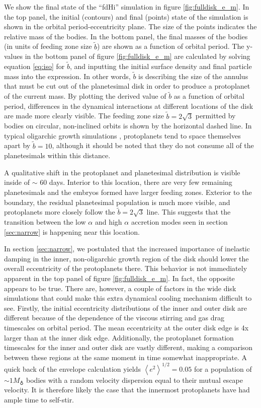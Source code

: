 \documentclass[twocolumn,linenumbers]{aastex63}
\begin{document}
We show the final state of the ``fdHi'' simulation in figure \ref{fig:fulldisk_e_m}. In the top panel,
the initial (contours) and final (points) state of the simulation is
shown in the orbital period-eccentricity plane. The size of the points
indicates the relative mass of the bodies. In the bottom panel, the
final masses of the bodies (in units of feeding zone size $\tilde{b}$) are shown
as a function of orbital period. The y-values in the bottom panel of figure \ref{fig:fulldisk_e_m} are calculated by solving equation \ref{eq:iso} for $\tilde{b}$, and inputting the initial surface density and final particle mass into the expression. In other words, $\tilde{b}$ is describing the size of the annulus that must be cut out of the planetesimal disk in order to produce a protoplanet of the current mass. By plotting the derived value of $
\tilde{b}$ as a function of orbital period, differences in the dynamical interactions at different locations of the disk are made more 
clearly visible. The feeding zone size $\tilde{b} = 2 \sqrt{3}$ permitted by bodies on circular, non-inclined orbits \citep{naka88} is shown by the
horizontal dashed line. In typical oligarchic growth simulations \citep{kokubo98}, protoplanets tend 
to space themselves apart by $\tilde{b} = 10$, although it should be noted that they do not consume all of the planetesimals 
within this distance.

A qualitative shift in the protoplanet and planetesimal distribution is visible inside of $\sim$ 60 days. Interior to this location, there are 
very few remaining planetesimals and the embryos formed have larger feeding zones. Exterior to the boundary, the residual 
planetesimal population is much more visible, and protoplanets more closely follow the $\tilde{b} = 2 \sqrt{3}$ line. This 
suggests that the transition between the low $\alpha$ and high $\alpha$ accretion modes seen in section \ref{sec:narrow} 
is happening near this location.

In section \ref{sec:narrow}, we postulated that the increased importance of inelastic damping in the inner, non-oligarchic growth 
region of the disk should lower the overall eccentricity of the protoplanets there. This behavior is not immediately apparent in the 
top panel of figure \ref{fig:fulldisk_e_m}. In fact, the opposite appears to be true. There are, however, a couple of factors in the wide disk simulations that could make this 
extra dynamical cooling mechanism difficult to see. Firstly, the initial eccentricity distributions of the inner and outer disk are 
different because of the dependence of the viscous stirring and gas drag timescales on orbital period. The mean eccentricity at the outer disk edge is 4x larger than at the inner disk edge. Additionally, the 
protoplanet formation timescales for the inner and outer disk are vastly different, making a comparison between these regions at 
the same moment in time somewhat inappropriate. A quick back of the envelope calculation yields $\left< e^2 \right>^{1/2} = 0.05$ for a population of $\sim 1 M_{\earth}$ bodies with a random velocity dispersion equal to their mutual escape velocity. It is therefore likely the case that the innermost protoplanets have had ample time to self-stir.
\end{document}

